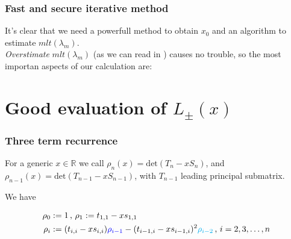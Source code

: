 \documentclass{beamer}
\newcommand{\R}{\mathbb{R}}
\newcommand{\deter}[1]{\mathrm{det}(#1)}
\theoremstyle{definition} \newtheorem{de}{Def}
\theoremstyle{remark} \newtheorem{os}[de]{Oss}
\theoremstyle{plain} \newtheorem{te}[de]{Teo}
\theoremstyle{plain} \newtheorem{co}[de]{Cor}
\theoremstyle{plain} \newtheorem{pr}[de]{Prop}
\theoremstyle{plain} \newtheorem{lem}[de]{Lemm}
\theoremstyle{remark} \newtheorem{rem}[de]{Remark}
\begin{document}
\begin{frame}
\frametitle{Fast and secure iterative method}

It's clear that we need a powerfull method to obtain $x_{0}$ and an algorithm to 
estimate $mlt(\lambda_m)$. \\
\emph{Overstimate} $mlt(\lambda_m)$ (as we can read in \cite{MR1289159}) causes no trouble, so the most importan aspects of our calculation are: 


\end{frame}


\section{Good evaluation of $L_{\pm}(x)$}

\begin{frame}
  \frametitle{Three term recurrence}
  For a generic $x\in\R$ we call $\rho_n(x) = \deter{T_n-x S_n}$,
  and $\rho_{n-1}(x) = \deter{T_{n-1}-x S_{n-1}}$, with $T_{n-1}$ leading principal submatrix. 

  We have

  \begin{align*}
    \rho_0 &:= 1\, \text{, } \rho_1:=t_{1,1}- x s_{1,1} \\
    \rho_i &:= (t_{i,i}- x s_{i,i})\textcolor{blue}{\rho_{i-1}} - (t_{i-1,i}-x s_{i-1,i})^2 \textcolor{cyan}{\rho_{i-2}}\, \text{, } i=2,3,\dots,n
  \end{align*}

\end{frame}
\end{document}
